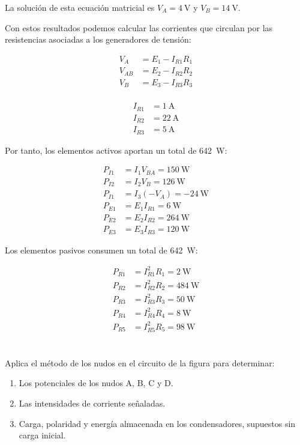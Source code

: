 \documentclass[10pt]{article}
\begin{document}
La solución de esta ecuación matricial es $V_A = \SI{4}{\volt}$ y $V_B = \SI{14}{\volt}$. 

Con estos resultados podemos calcular las corrientes que circulan por las resistencias asociadas a los generadores de tensión:

\begin{align*}
V_A &= E_1 - I_{R1} R_1\\
V_{AB} &= E_2 - I_{R2} R_2\\
V_B &= E_3 - I_{R3} R_3\\
\end{align*}

\begin{align*}
I_{R1} &= \SI{1}{\ampere}\\
I_{R2} &= \SI{22}{\ampere}\\
I_{R3} &= \SI{5}{\ampere}
\end{align*}

Por tanto, los elementos activos aportan un total de \SI{642}{\watt}:

\begin{align*}
P_{I1} &= I_1 V_{BA} = \SI{150}{\watt}\\
P_{I2} &= I_2 V_{B} = \SI{126}{\watt}\\
P_{I1} &= I_3 (-V_{A}) = - \SI{24}{\watt}\\
P_{E1} &= E_1 I_{R1} = \SI{6}{\watt}\\
P_{E2} &= E_2 I_{R2} = \SI{264}{\watt}\\
P_{E3} &= E_3 I_{R3} = \SI{120}{\watt}
\end{align*}

Los elementos pasivos consumen un total de \SI{642}{\watt}:

\begin{align*}
P_{R1} &= I^2_{R1} R_1 = \SI{2}{\watt}\\
P_{R2} &= I^2_{R2} R_2 = \SI{484}{\watt}\\
P_{R3} &= I^2_{R3} R_3 = \SI{50}{\watt}\\
P_{R4} &= I^2_{R4} R_4 = \SI{8}{\watt}\\
P_{R5} &= I^2_{R5} R_5 = \SI{98}{\watt}
\end{align*}

\clearpage

\section{}
Aplica el método de los nudos en el circuito de la figura para determinar:
\begin{enumerate}
\item Los potenciales de los nudos A, B, C y D.
\item Las intensidades de corriente señaladas.
\item Carga, polaridad y energía almacenada en los condensadores,
  supuestos sin carga inicial.
\end{enumerate}
\end{document}
